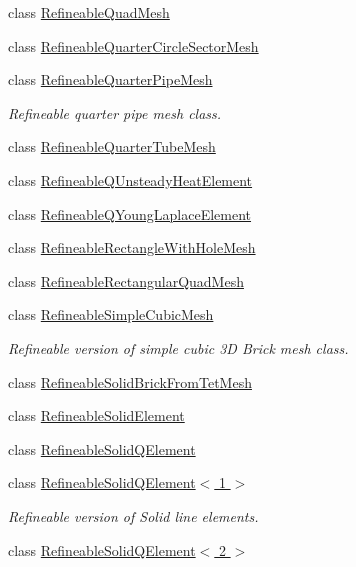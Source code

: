 \begin{DoxyCompactItemize}
class \hyperlink{classoomph_1_1RefineableQuadMesh}{Refineable\+Quad\+Mesh}
\item 
class \hyperlink{classoomph_1_1RefineableQuarterCircleSectorMesh}{Refineable\+Quarter\+Circle\+Sector\+Mesh}
\item 
class \hyperlink{classoomph_1_1RefineableQuarterPipeMesh}{Refineable\+Quarter\+Pipe\+Mesh}
\begin{DoxyCompactList}\small\item\em Refineable quarter pipe mesh class. \end{DoxyCompactList}\item 
class \hyperlink{classoomph_1_1RefineableQuarterTubeMesh}{Refineable\+Quarter\+Tube\+Mesh}
\item 
class \hyperlink{classoomph_1_1RefineableQUnsteadyHeatElement}{Refineable\+Q\+Unsteady\+Heat\+Element}
\item 
class \hyperlink{classoomph_1_1RefineableQYoungLaplaceElement}{Refineable\+Q\+Young\+Laplace\+Element}
\item 
class \hyperlink{classoomph_1_1RefineableRectangleWithHoleMesh}{Refineable\+Rectangle\+With\+Hole\+Mesh}
\item 
class \hyperlink{classoomph_1_1RefineableRectangularQuadMesh}{Refineable\+Rectangular\+Quad\+Mesh}
\item 
class \hyperlink{classoomph_1_1RefineableSimpleCubicMesh}{Refineable\+Simple\+Cubic\+Mesh}
\begin{DoxyCompactList}\small\item\em Refineable version of simple cubic 3D Brick mesh class. \end{DoxyCompactList}\item 
class \hyperlink{classoomph_1_1RefineableSolidBrickFromTetMesh}{Refineable\+Solid\+Brick\+From\+Tet\+Mesh}
\item 
class \hyperlink{classoomph_1_1RefineableSolidElement}{Refineable\+Solid\+Element}
\item 
class \hyperlink{classoomph_1_1RefineableSolidQElement}{Refineable\+Solid\+Q\+Element}
\item 
class \hyperlink{classoomph_1_1RefineableSolidQElement_3_011_01_4}{Refineable\+Solid\+Q\+Element$<$ 1 $>$}
\begin{DoxyCompactList}\small\item\em Refineable version of Solid line elements. \end{DoxyCompactList}\item 
class \hyperlink{classoomph_1_1RefineableSolidQElement_3_012_01_4}{Refineable\+Solid\+Q\+Element$<$ 2 $>$}

\end{DoxyCompactItemize}

